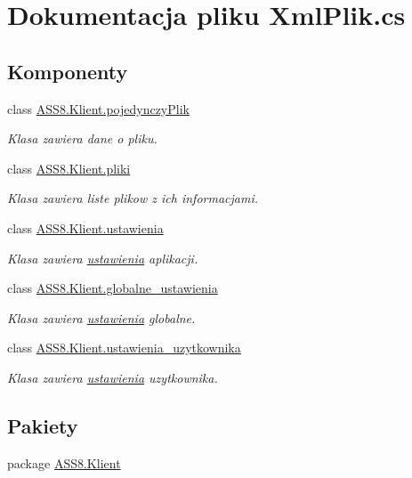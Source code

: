\hypertarget{a00054}{
\section{Dokumentacja pliku XmlPlik.cs}
\label{d1/dea/a00054}
}
\subsection*{Komponenty}
\begin{CompactItemize}
\item 
class \hyperlink{a00020}{ASS8.Klient.pojedynczyPlik}
\begin{CompactList}\small\item\em Klasa zawiera dane o pliku. \item\end{CompactList}\item 
class \hyperlink{a00017}{ASS8.Klient.pliki}
\begin{CompactList}\small\item\em Klasa zawiera liste plikow z ich informacjami. \item\end{CompactList}\item 
class \hyperlink{a00028}{ASS8.Klient.ustawienia}
\begin{CompactList}\small\item\em Klasa zawiera \hyperlink{a00028}{ustawienia} aplikacji. \item\end{CompactList}\item 
class \hyperlink{a00006}{ASS8.Klient.globalne\_\-ustawienia}
\begin{CompactList}\small\item\em Klasa zawiera \hyperlink{a00028}{ustawienia} globalne. \item\end{CompactList}\item 
class \hyperlink{a00029}{ASS8.Klient.ustawienia\_\-uzytkownika}
\begin{CompactList}\small\item\em Klasa zawiera \hyperlink{a00028}{ustawienia} uzytkownika. \item\end{CompactList}\end{CompactItemize}
\subsection*{Pakiety}
\begin{CompactItemize}
\item 
package \hyperlink{a00060}{ASS8.Klient}
\end{CompactItemize}
